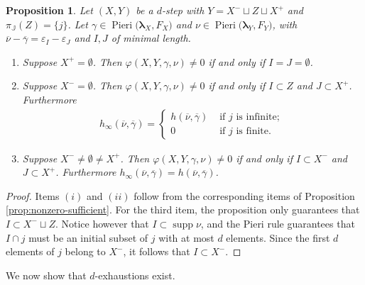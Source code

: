 \documentclass[11pt,fleqn]{amsart}
\newcommand\JJ{\mathbb J}
\renewcommand\phi{\varphi}
\renewcommand\epsilon{\varepsilon}
\newtheorem{prop}[thm]{Proposition}
\theoremstyle{definition}
\theoremstyle{remark}
\theoremstyle{remark}
\newcommand\wt[1]{\boldsymbol{#1}}
\DeclareMathOperator\supp{supp}
\newcommand\Pieri[2]{\operatorname{Pieri}{(#1},{#2)}}
\newcommand\map[4]{\phi(#3,#4,#1,#2)}
\begin{document}
\begin{prop}
\label{prop:d-nonzero}
Let $(X,Y)$ be a $d$-step with $Y = X^- \sqcup Z \sqcup X^+$ and $\pi_\JJ(Z)
= \{j\}$. Let $\gamma \in \Pieri{\wt\lambda_X}{F_X}$ and $\nu \in 
\Pieri{\wt\lambda_Y}{F_Y}$, with $\overline{\nu} - \overline{\gamma} = 
\epsilon_I - \epsilon_J$ and $I,J$ of minimal length. 
\begin{enumerate}
  \item Suppose $X^+ = \emptyset$. Then $\map{\gamma}{\nu}{X}{Y} \neq 0$
    if and only if $I = J = \emptyset$.
  \item Suppose $X^- = \emptyset$. Then $\map{\gamma}{\nu}{X}{Y} \neq 0$ if and 
    only if $I \subset Z$ and $J \subset X^+$. Furthermore
    \begin{align*}
      h_\infty(\overline{\nu},\overline{\gamma}) =
        \begin{cases}
          h(\overline{\nu},\overline{\gamma}) & \mbox{ if $j$ is infinite; } \\
          0 &\mbox{ if $j$ is finite. }
        \end{cases}
    \end{align*}
  \item Suppose $X^- \neq \emptyset \neq X^+$. Then $\map{\gamma}{\nu}{X}{Y} 
    \neq 0$ if and only if $I \subset X^-$ and $J \subset X^+$. Furthermore 
    $h_\infty(\overline{\nu},\overline{\gamma}) = 
    h(\overline{\nu},\overline{\gamma})$.
\end{enumerate}
\end{prop}
\begin{proof}
Items $(i)$ and $(ii)$ follow from the corresponding items of Proposition 
\ref{prop:nonzero-sufficient}. For the third item, the proposition only 
guarantees that $I\subset X^- \sqcup Z$. Notice however that $I \subset \supp 
\nu$, and the Pieri rule guarantees that $I \cap j$ must be an 
initial subset of $j$ with at most $d$ elements. Since the first $d$ elements 
of $j$ belong to $X^-$, it follows that $I \subset X^-$.
\end{proof}

We now show that $d$-exhaustions exist. 
\end{document}
